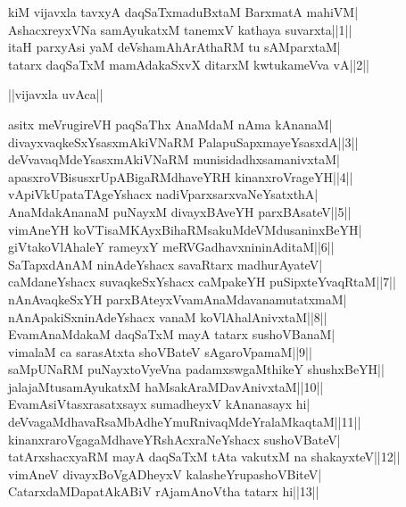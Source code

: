 \documentclass{article}
\begin{document}
kiM vijavxla tavxyA daqSaTxmaduBxtaM BarxmatA mahiVM|\\
AshacxreyxVNa samAyukatxM tanemxV kathaya suvarxta||1||\\
itaH parxyAsi yaM deVshamAhArAthaRM tu sAMparxtaM|\\
tatarx daqSaTxM mamAdakaSxvX ditarxM kwtukameVva vA||2||\\

\begin{center}
||vijavxla uvAca||
\end{center}

asitx meVrugireVH paqSaThx AnaMdaM nAma kAnanaM|\\
divayxvaqkeSxYsasxmAkiVNaRM PalapuSapxmayeYsasxdA||3||\\
deVvavaqMdeYsasxmAkiVNaRM munisidadhxsamanivxtaM|\\
apasxroVBisusxrUpABigaRMdhaveYRH kinanxroVrageYH||4||\\
vApiVkUpataTAgeYshacx nadiVparxsarxvaNeYsatxthA|\\
AnaMdakAnanaM puNayxM divayxBAveYH parxBAsateV||5||\\
vimAneYH koVTisaMKAyxBihaRMsakuMdeVMdusaninxBeYH|\\
giVtakoVlAhaleY rameyxY meRVGadhavxnininAditaM||6||\\
SaTapxdAnAM ninAdeYshacx savaRtarx madhurAyateV|\\
caMdaneYshacx suvaqkeSxYshacx caMpakeYH puSipxteYvaqRtaM||7||\\
nAnAvaqkeSxYH parxBAteyxVvamAnaMdavanamutatxmaM|\\
nAnApakiSxninAdeYshacx vanaM koVlAhalAnivxtaM||8||\\
EvamAnaMdakaM daqSaTxM mayA tatarx sushoVBanaM|\\
vimalaM ca sarasAtxta shoVBateV sAgaroVpamaM||9||\\
saMpUNaRM puNayxtoVyeVna padamxswgaMthikeY shushxBeYH||\\
jalajaMtusamAyukatxM haMsakAraMDavAnivxtaM||10||\\
EvamAsiVtasxrasatxsayx sumadheyxV kAnanasayx hi|\\
deVvagaMdhavaRsaMbAdheYmuRnivaqMdeYralaMkaqtaM||11||\\
kinanxraroVgagaMdhaveYRshAcxraNeYshacx sushoVBateV|\\
tatArxshacxyaRM mayA daqSaTxM tAta vakutxM na shakayxteV||12||\\
vimAneV divayxBoVgADheyxV kalasheYrupashoVBiteV|\\
CatarxdaMDapatAkABiV rAjamAnoVtha tatarx hi||13||\\
\end{document}
